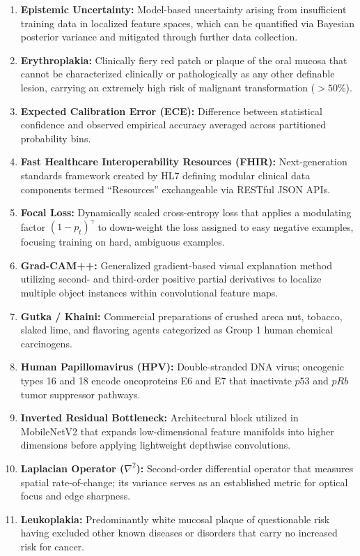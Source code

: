 \documentclass[12pt,a4paper,oneside]{report}
\begin{document}
\begin{enumerate}[label=\arabic*.]
    \item \textbf{Epistemic Uncertainty:} Model-based uncertainty arising from insufficient training data in localized feature spaces, which can be quantified via Bayesian posterior variance and mitigated through further data collection.
    \item \textbf{Erythroplakia:} Clinically fiery red patch or plaque of the oral mucosa that cannot be characterized clinically or pathologically as any other definable lesion, carrying an extremely high risk of malignant transformation ($>50\%$).
    \item \textbf{Expected Calibration Error (ECE):} Difference between statistical confidence and observed empirical accuracy averaged across partitioned probability bins.
    \item \textbf{Fast Healthcare Interoperability Resources (FHIR):} Next-generation standards framework created by HL7 defining modular clinical data components termed ``Resources'' exchangeable via RESTful JSON APIs.
    \item \textbf{Focal Loss:} Dynamically scaled cross-entropy loss that applies a modulating factor $(1 - p_t)^\gamma$ to down-weight the loss assigned to easy negative examples, focusing training on hard, ambiguous examples.
    \item \textbf{Grad-CAM++:} Generalized gradient-based visual explanation method utilizing second- and third-order positive partial derivatives to localize multiple object instances within convolutional feature maps.
    \item \textbf{Gutka / Khaini:} Commercial preparations of crushed areca nut, tobacco, slaked lime, and flavoring agents categorized as Group 1 human chemical carcinogens.
    \item \textbf{Human Papillomavirus (HPV):} Double-stranded DNA virus; oncogenic types 16 and 18 encode oncoproteins E6 and E7 that inactivate $p53$ and $pRb$ tumor suppressor pathways.
    \item \textbf{Inverted Residual Bottleneck:} Architectural block utilized in MobileNetV2 that expands low-dimensional feature manifolds into higher dimensions before applying lightweight depthwise convolutions.
    \item \textbf{Laplacian Operator ($\nabla^2$):} Second-order differential operator that measures spatial rate-of-change; its variance serves as an established metric for optical focus and edge sharpness.
    \item \textbf{Leukoplakia:} Predominantly white mucosal plaque of questionable risk having excluded other known diseases or disorders that carry no increased risk for cancer.

\end{enumerate}
\end{document}
